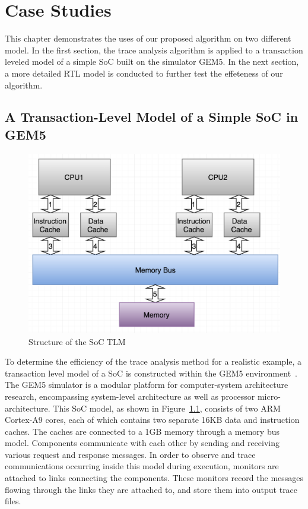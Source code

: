 \documentclass[12pt,frontmatter,copyright,thesis]{usfmanus}
\begin{document}
\chapter{Case Studies}
This chapter demonstrates the uses of our proposed
algorithm on two different model. In the
first section, the trace analysis algorithm is applied to
a transaction leveled model of a simple SoC
built on the simulator GEM5. 
In the next section, 
a more detailed RTL model is conducted to
further test the effeteness of our algorithm.

\section{A Transaction-Level Model of a Simple SoC in GEM5}
\begin{figure} 
\centerline{
\includegraphics[width=5in]{Gem5.png}}
\caption{Structure of the SoC TLM}
\label{SoC}
\end{figure}

To determine the efficiency of the trace analysis method for
a realistic example, a transaction level model of a SoC is
constructed within the GEM5 environment~\cite{Binkert2011}.
The GEM5 simulator is a modular platform for computer-system architecture research, 
encompassing system-level architecture as well as processor micro-architecture.
This SoC model, as shown in Figure~\ref{SoC}, consists of two
ARM Cortex-A9 cores, each of which contains two separate
16KB data and instruction caches.  The caches are connected
to a 1GB memory through a memory bus model.  Components
communicate with each other by sending and receiving various
request and response messages.  In order to observe and
trace communications occurring inside this model during
execution, monitors are attached to links connecting the
components.  These monitors record the messages flowing
through the links they are attached to, and store them into
output trace files.
\end{document}
